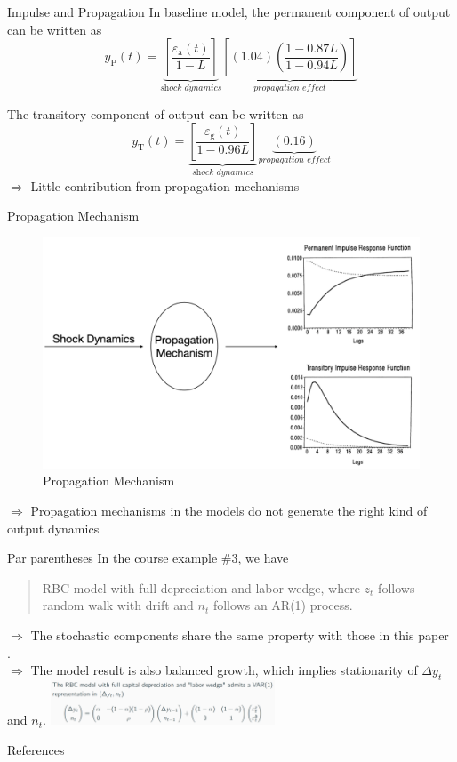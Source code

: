 \documentclass[10pt]{beamer}
\begin{document}
\begin{frame}{Impulse and Propagation}
    In baseline model, the permanent component of output can be written as
    $$
        y_{\mathrm{P}}(t)=\underbrace{\left[\frac{\varepsilon_{\mathrm{a}}(t)}{1-L}\right]}_{\textit{shock dynamics}}\underbrace{\left[(1.04)\left(\frac{1-0.87 L}{1-0.94 L}\right)\right]}_{\textit{propagation effect}}
    $$

    The transitory component of output can be written as $$
        y_{\mathrm{T}}(t)=\underbrace{\left[\frac{\varepsilon_{\mathrm{g}}(t)}{1-0.96
                    L}\right]}_{\textit{shock dynamics}}\underbrace{(0.16)}_{\textit{propagation
            effect}} $$ $\Rightarrow$ Little contribution from propagation mechanisms

\end{frame}

\begin{frame}{Propagation Mechanism}
    \begin{figure}
        \centering
        \includegraphics[width=0.8\linewidth]{figures/propagation0.png}
        \caption{Propagation Mechanism}
    \end{figure}

    $\Rightarrow$ Propagation mechanisms in the models do not generate the right kind of output dynamics
\end{frame}

\begin{frame}{Par parentheses}
    In the course example \#3, we have
    \begin{quote}
        RBC model with full depreciation and labor wedge, where $z_t$ follows random walk with drift and $n_t$ follows an AR(1) process.
    \end{quote}
    $\Longrightarrow$ The stochastic components share the same property with those in this paper \cite{cogley_nason_1995}.\\
    $\Longrightarrow$ The model result is also balanced growth, which implies stationarity of $\Delta y_t$ and $n_t$.
    \includegraphics*[width=0.5\textwidth]{figures/example3.png}
\end{frame}

\begin{frame}[allowframebreaks]{References}

    
    

\end{frame}
\end{document}
